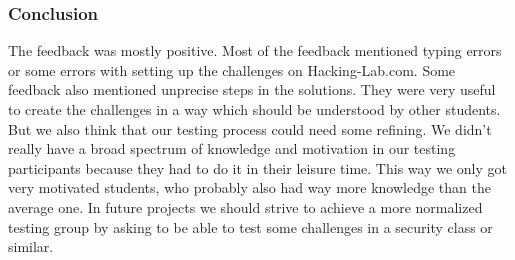\subsubsection{Conclusion}
The feedback was mostly positive. Most of the feedback mentioned typing errors or some errors with setting up the challenges on Hacking-Lab.com. Some feedback also mentioned unprecise steps in the solutions. They were very useful to create the challenges in a way which should be understood by other students. \\
But we also think that our testing process could need some refining. We didn't really have a broad spectrum of knowledge and motivation in our testing participants because they had to do it in their leisure time. This way we only got very motivated students, who probably also had way more knowledge than the average one. In future projects we should strive to achieve a more normalized testing group by asking to be able to test some challenges in a security class or similar.
